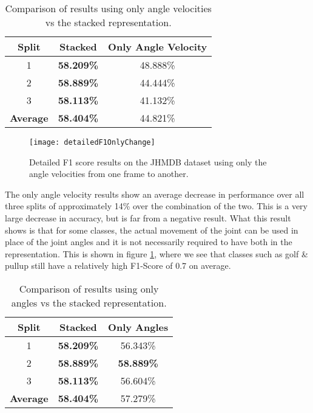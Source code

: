 \begin{table}[ht]
	\centering
	\begin{tabular}{||c c c||} 
		\hline
		\textbf{Split} & \textbf{Stacked} & \textbf{Only Angle Velocity} \\ [0.5ex] 
		\hline\hline
		1 & \textbf{58.209\%} & 48.888\% \\ 
		\hline
		2 & \textbf{58.889\%} & 44.444\% \\
		\hline
		3 & \textbf{58.113\%} & 41.132\% \\
		\hline
		\hline
		\textbf{Average} & \textbf{58.404\%} & 44.821\% \\
		\hline
	\end{tabular}
	\caption{Comparison of results using only angle velocities vs the stacked representation.}
	\label{tab:acc-results-v-velocity}
\end{table}

\begin{figure}[ht]
	\texttt{[image: detailedF1OnlyChange]}
	\centering
	\caption{Detailed F1 score results on the JHMDB dataset using only the angle velocities from one frame to another.}
	\label{fig:detailed-f1-only-change}
\end{figure}

The only angle velocity results show an average decrease in performance over all three splits of approximately 14\% over the combination of the two. This is a very large decrease in accuracy, but is far from a negative result. What this result shows is that for some classes, the actual movement of the joint can be used in place of the joint angles and it is not necessarily required to have both in the representation. This is shown in figure \ref{fig:detailed-f1-only-change}, where we see that classes such as golf \& pullup still have a relatively high F1-Score of 0.7 on average.

\begin{table}[ht]
	\centering
	\begin{tabular}{||c c c||} 
		\hline
		\textbf{Split} & \textbf{Stacked} & \textbf{Only Angles} \\ [0.5ex] 
		\hline\hline
		1 & \textbf{58.209\%} & 56.343\% \\ 
		\hline
		2 & \textbf{58.889\%} & \textbf{58.889\%} \\
		\hline
		3 & \textbf{58.113\%} & 56.604\% \\
		\hline
		\hline
		\textbf{Average} & \textbf{58.404\%} & 57.279\% \\
		\hline
	\end{tabular}
	\caption{Comparison of results using only angles vs the stacked representation.}
	\label{tab:acc-results-v-angle}
\end{table}

